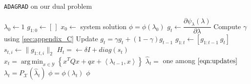 \documentclass[notitlepage]{article}
\DeclareMathOperator*{\argmin}{arg\,min}
\begin{document}
\begin{algorithm}[H]
  \caption{\texttt{ADAGRAD} on our dual problem}
  \label{alg:my_alg}
  \begin{algorithmic}
      \State $\lambda_0 \gets 1$
      \State $g_{1:0} \gets \left[\,\right]$
      \State $x_0 \gets$ system solution  
      \State $\phi = \phi(\lambda_0)$
        \State $g_t \gets \dfrac{\partial \psi_\lambda(\lambda)}{\partial \lambda}$
            \State Compute $\gamma$ using \ref{sec:appendix_C}
            \State Update $g_t = \gamma g_t + (1 - \gamma) g_{t-1}$
          \EndIf
        \State $g_{1:t} \gets \left[ g_{1:t-1}\ g_t \right]$
        \State $s_{t,i} \gets \| g_{1:t,i} \|_2$
        \State $H_t = \gets \delta \mathit{I} + diag(s_t)$
        \State $x_t = \argmin_{x \in \mathcal{Y}} \left\lbrace x^T Q x + q x + \left\langle \lambda_{t-1},x \right\rangle \right\rbrace$
        \State $\hat{\lambda}_t =$ one among $\eqref{eqn:updates}$
        \State $\lambda_t = P_\mathcal{X}(\hat{\lambda}_t)$ 
          \State $\phi = \phi(\lambda_t)$
        \EndIf
          \State \Return $\phi$ 
        \EndIf
      \EndFor
    \EndFunction
  \end{algorithmic}  
\end{algorithm}
\end{document}
